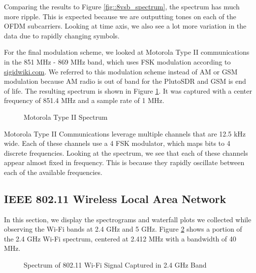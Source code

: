 \documentclass{article}
\begin{document}
Comparing the results to Figure \ref{fig::8vsb_spectrum}, the spectrum has much more ripple. This is expected because we are outputting tones on each of the OFDM subcarriers. Looking at time axis, we also see a lot more variation in the data due to rapidly changing symbols.

For the final modulation scheme, we looked at Motorola Type II communications in the 851 MHz - 869 MHz band, which uses FSK modulation according to \url{sigidwiki.com}. We referred to this modulation scheme instead of AM or GSM modulation because AM radio is out of band for the PlutoSDR and GSM is end of life. The resulting spectrum is shown in Figure \ref{fig::police_radio_spectrum}. It was captured with a center frequency of 851.4 MHz and a sample rate of 1 MHz.

\begin{figure}[H]
	\centerline{}
	\caption{Motorola Type II Spectrum}
	\label{fig::police_radio_spectrum}
\end{figure}

Motorola Type II Communications leverage multiple channels that are 12.5 kHz wide. Each of these channels use a 4 FSK modulator, which maps bits to 4 discrete frequencies. Looking at the spectrum, we see that each of these channels appear almost fixed in frequency. This is because they rapidly oscillate between each of the available frequencies.

\subsection{IEEE 802.11 Wireless Local Area Network}

In this section, we display the spectrograms and waterfall plots we collected while observing the Wi-Fi bands at 2.4 GHz and 5 GHz. Figure \ref{fig::2_412_wifi_spectrum} shows a portion of the 2.4 GHz Wi-Fi spectrum, centered at 2.412 MHz with a bandwidth of 40 MHz.

\begin{figure}[H]
	\centerline{}
	\caption{Spectrum of 802.11 Wi-Fi Signal Captured in 2.4 GHz Band}
	\label{fig::2_412_wifi_spectrum}
\end{figure}
\end{document}

